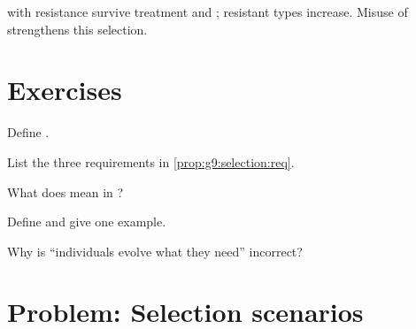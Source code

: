 \begin{example}\label{ex:g9:selection:ab}
 with resistance  survive treatment and ; resistant
types increase. Misuse of  strengthens this selection.
\end{example}

\section{Exercises}

\begin{exercise}[$\star$]\label{exo:g9:selection:1}
Define .
\end{exercise}

\begin{exercise}[$\star$]\label{exo:g9:selection:2}
List the three requirements in \cref{prop:g9:selection:req}.
\end{exercise}

\begin{exercise}[$\star$]\label{exo:g9:selection:3}
What does  mean in ?
\end{exercise}

\begin{exercise}[$\star$]\label{exo:g9:selection:4}
Define  and give one example.
\end{exercise}

\begin{exercise}[$\star$]\label{exo:g9:selection:5}
Why is ``individuals evolve what they need'' incorrect?
\end{exercise}

\section{Problem: Selection scenarios}

